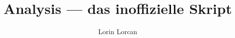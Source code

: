 \documentclass[10pt,a4paper]{scrartcl}
\title{Analysis --- das inoffizielle Skript}
\author{Lorin Lorcan}
\date{}
\begin{document}


\tableofcontents
\pagebreak


\bigskip\bigskip











\end{document}
